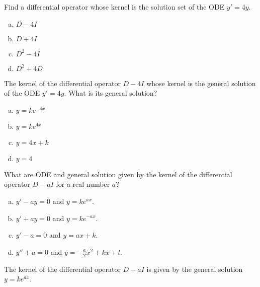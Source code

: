 \begin{applicationActivities}
\begin{activity}{5}
Find a differential operator whose kernel is the solution set of the ODE \(y'=4y\).
\begin{enumerate}[a)]
\item \(D-4I\)
\item \(D+4I\)
\item \(D^2-4I\)
\item \(D^2+4D\)
\end{enumerate}
\end{activity}

\begin{activity}{5}
The kernel of the differential operator \(D-4I\) whose kernel is the general solution of the ODE 
\(y'=4y\). What is its general solution?
\begin{enumerate}[a)]
\item \(y=ke^{-4x}\)
\item \(y=ke^{4x}\)
\item \(y=4x+k\)
\item \(y=4\)
\end{enumerate}
\end{activity}

\begin{activity}{5}
What are ODE and general solution given by the kernel of the differential operator \(D-aI\) for a real number \(a\)?
\begin{enumerate}[a)]
\item \(y'-ay=0\) and \(y=ke^{ax}\).
\item \(y'+ay=0\) and \(y=ke^{-ax}\).
\item \(y'-a=0\) and \(y=ax+k\).
\item \(y''+a=0\) and \(y=-\frac{a}{2}x^2+kx+l\).
\end{enumerate}
\end{activity}

\begin{observation}
The kernel of the differential operator \(D-aI\) is given by the general solution \(y=ke^{ax}\).
\end{observation}


\end{applicationActivities}
